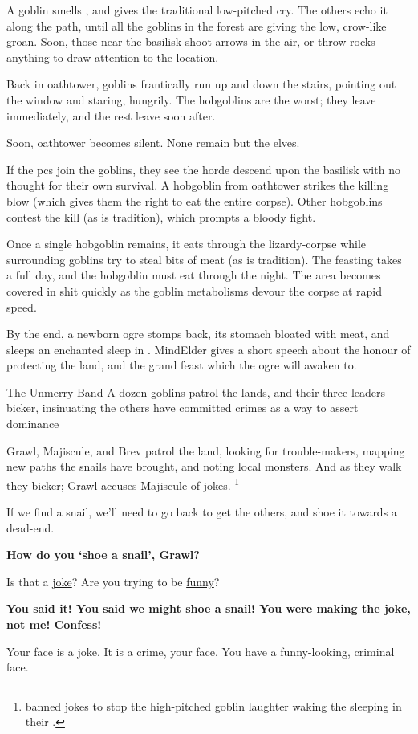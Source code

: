 A goblin smells , and gives the traditional low-pitched cry.
The others echo it along the path, until all the goblins in the forest are giving the low, crow-like groan.
Soon, those near the \gls{basilisk} shoot arrows in the air, or throw rocks -- anything to draw attention to the location.

Back in \gls{oathtower}, goblins frantically run up and down the stairs, pointing out the window and staring, hungrily.
The hobgoblins are the worst; they leave immediately, and the rest leave soon after.

Soon, \gls{oathtower} becomes silent.
None remain but the elves.

If the \glspl{pc} join the goblins, they see the horde descend upon the \gls{basilisk} with no thought for their own survival.
A hobgoblin from \gls{oathtower} strikes the killing blow (which gives them the right to eat the entire corpse).
Other hobgoblins contest the kill (as is tradition), which prompts a bloody fight.

\basilisk

Once a single hobgoblin remains, it eats through the lizardy-corpse while surrounding goblins try to steal bits of meat (as is tradition).
The feasting takes a full day, and the hobgoblin must eat through the night.
The area becomes covered in shit quickly as the goblin metabolisms devour the corpse at rapid speed.

By the end, a newborn \gls{ogre} stomps back, its stomach bloated with meat, and sleeps an enchanted sleep in .
\Gls{MindElder} gives a short speech about the honour of protecting the land, and the grand feast which the \gls{ogre} will awaken to.

{The Unmerry Band}%
{A dozen goblins patrol the lands, and their three leaders bicker, insinuating the others have committed crimes as a way to assert dominance}%

Grawl, Majiscule, and Brev patrol the land, looking for trouble-makers, mapping new paths the snails have brought, and noting local monsters.
And as they walk they bicker; Grawl accuses Majiscule of jokes.%
\footnote{ banned jokes to stop the high-pitched goblin laughter waking the  sleeping in their .}

\begin{speechtext}
  If we find a snail, we'll need to go back to get the others, and shoe it towards a dead-end.

  \textbf{How do you `shoe a snail', Grawl?}

  Is that a \underline{joke}?
  Are you trying to be \underline{funny}?

  \textbf{You said it!
  You said we might shoe a snail!
  You were making the joke, not me!
  Confess!}

  Your face is a joke.
  It is a crime, your face.
  You have a funny-looking, criminal face.
\end{speechtext}

